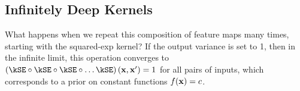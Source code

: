 \subsection{Infinitely Deep Kernels}
What happens when we repeat this composition of feature maps many times, starting with the squared-exp kernel?
If the output variance is set to 1, then in the infinite limit, this operation converges to $\left(\kSE \circ \kSE \circ \kSE \circ \ldots \kSE\right)(\vx,\vx') = 1$ for all pairs of inputs, which corresponds to a prior on constant functions $f({\bf{x}}) = c$.

%


